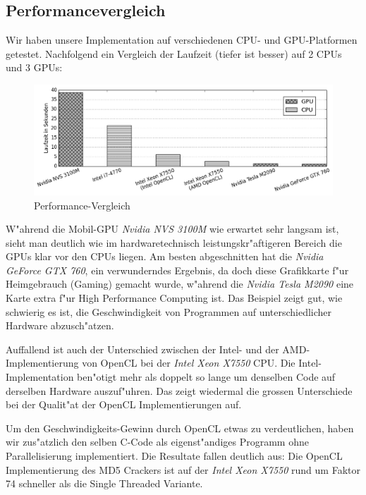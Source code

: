 \begin{refsection}
\subsection{Performancevergleich}

Wir haben unsere Implementation auf verschiedenen CPU- und GPU-Platformen
getestet. Nachfolgend ein Vergleich der Laufzeit (tiefer ist besser) auf 2 CPUs
und 3 GPUs:

\begin{figure}[H]
	\centering
	\includegraphics[width=.9\textwidth]{crypto/graphs/speed_comparison_v1.png}
	\caption{Performance-Vergleich}
	\label{img:crypto:speed_comparison_v1}
\end{figure}

W"ahrend die Mobil-GPU \textit{Nvidia NVS 3100M} wie erwartet sehr
langsam ist, sieht man deutlich wie im hardwaretechnisch leistungskr"aftigeren
Bereich die GPUs klar vor den CPUs liegen. Am besten abgeschnitten hat die
\textit{Nvidia GeForce GTX 760}, ein verwunderndes Ergebnis, da doch diese
Grafikkarte f"ur Heimgebrauch (Gaming) gemacht wurde, w"ahrend die
\textit{Nvidia Tesla M2090} eine Karte extra f"ur High Performance Computing
ist. Das Beispiel zeigt gut, wie schwierig es ist, die Geschwindigkeit von
Programmen auf unterschiedlicher Hardware abzusch"atzen.

Auffallend ist auch der Unterschied zwischen der Intel- und der
AMD-Implementierung von OpenCL bei der \textit{Intel Xeon X7550} CPU. Die
Intel-Implementation ben"otigt mehr als doppelt so lange um denselben Code auf
derselben Hardware auszuf"uhren. Das zeigt wiedermal die grossen Unterschiede
bei der Qualit"at der OpenCL Implementierungen auf.

Um den Geschwindigkeits-Gewinn durch OpenCL etwas zu verdeutlichen, haben wir
zus"atzlich den selben C-Code als eigenst"andiges Programm ohne Parallelisierung
implementiert. Die Resultate fallen deutlich aus: Die OpenCL Implementierung des
MD5 Crackers ist auf der \textit{Intel Xeon X7550} rund um Faktor 74 schneller
als die Single Threaded Variante.


\end{refsection}
